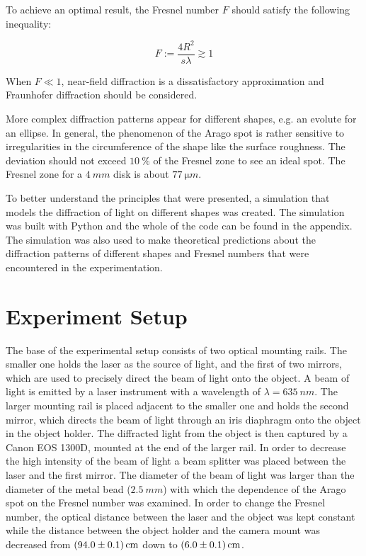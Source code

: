 \documentclass[11pt,a4paper]{article}
\begin{document}
To achieve an optimal result, the Fresnel number \(F\) should satisfy the following inequality:

\[F := \frac{4R^{2}}{s\lambda} \gtrsim 1\]

When \(F \ll 1\), near-field diffraction is a dissatisfactory approximation and Fraunhofer diffraction should be considered.

More complex diffraction patterns appear for different shapes, e.g. an evolute for an ellipse. In general, the phenomenon of the Arago spot is rather sensitive to irregularities in the circumference of the shape like the surface roughness. The deviation should not exceed \(\SI{10}{\percent}\) of the Fresnel zone to see an ideal spot. The Fresnel zone for a \(\SI{4}{mm}\) disk is about \(\SI{77}{\micro m}\). \cite{WikipediaAragoSpot}

To better understand the principles that were presented, a simulation that models the diffraction of light on different shapes was created. The simulation was built with Python and the whole of the code can be found in the appendix. The simulation was also used to make theoretical predictions about the diffraction patterns of different shapes and Fresnel numbers that were encountered in the experimentation. 

\section{Experiment Setup}
The base of the experimental setup consists of two optical mounting rails. The smaller one holds the laser as the source of light, and the first of two mirrors, which are used to precisely direct the beam of light onto the object. A beam of light is emitted by a laser instrument with a wavelength of \(\lambda = \SI{635}{nm}\). The larger mounting rail is placed adjacent to the smaller one and holds the second mirror, which directs the beam of light through an iris diaphragm onto the object in the object holder. The diffracted light from the object is then captured by a Canon EOS 1300D, mounted at the end of the larger rail.  In order to decrease the high intensity of the beam of light a beam splitter was placed between the laser and the first mirror.  
The diameter of the beam of light was larger than the diameter of the metal bead (\(\SI{2.5}{mm}\)) with which the dependence of the Arago spot on the Fresnel number was examined. 
In order to change the Fresnel number, the optical distance between the laser and the object was kept constant while the distance between the object holder and the camera mount was decreased from \(\SI{94+-0.1}{cm}\) down to \(\SI{6+-0.1}{cm}\). 
\end{document}
